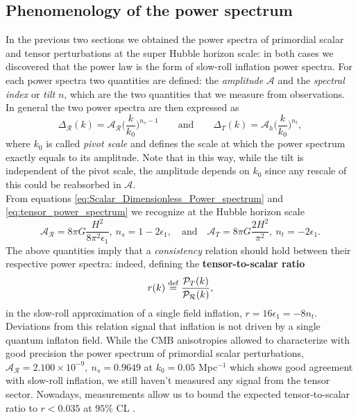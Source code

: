 \subsection{Phenomenology of the power spectrum}
In the previous two sections we obtained the power spectra of primordial scalar and tensor perturbations at the super Hubble horizon scale: in both cases we discovered that the power law is the form of slow-roll inflation power spectra. For each power spectra two quantities are defined: the \emph{amplitude} $\mathcal A$ and the \emph{spectral index} or \emph{tilt} $n$, which are the two quantities that we measure from observations. In general the two power spectra are then expressed as
\begin{equation}
    \Delta_\mathcal{R}(k)=\mathcal{A_R}\bigg(\frac{k}{k_0}\bigg)^{n_s-1}\qquad\text{and}\qquad\Delta_T(k)=\mathcal{A}_h\bigg(\frac{k}{k_0}\bigg)^{n_t},
\end{equation}
where $k_0$ is called \emph{pivot scale} and defines the scale at which the power spectrum exactly equals to its amplitude. Note that in this way, while the tilt is independent of the pivot scale, the amplitude depends on $k_0$ since any rescale of this could be reabsorbed in $\mathcal A$.\\ From equations \eqref{eq:Scalar_Dimensionless_Power_spectrum} and \eqref{eq:tensor_power_spectrum} we recognize at the Hubble horizon scale
\begin{equation}
    \mathcal{A_R}=8\pi G\frac{H^2}{8\pi^2\epsilon_1},\ n_s=1-2\epsilon_1,\quad\text{and}\quad\mathcal{A}_T=8\pi G\frac{2H^2}{\pi^2},\ n_t=-2\epsilon_1.
\end{equation}
The above quantities imply that a \emph{consistency} relation should hold between their respective power spectra: indeed, defining the \textbf{tensor-to-scalar ratio}
\begin{equation}
    r(k)\stackrel{\text{def}}{=}\frac{\mathcal{P}_T(k)}{\mathcal{P_R}(k)},
\end{equation} 
in the slow-roll approximation of a single field inflation, $r=16\epsilon_1=-8n_t$. Deviations from this relation signal that inflation is not driven by a single quantum inflaton field. While the CMB anisotropies allowed to characterize with good precision the power spectrum of primordial scalar perturbations, $\mathcal{A_R}=2.100\times 10^{-9},\ n_s=0.9649$ at $k_0=0.05$ Mpc$^{-1}$ \cite{planck2018results} which shows good agreement with slow-roll inflation, we still haven't measured any signal from the tensor sector. Nowadays, measurements allow us to bound the expected tensor-to-scalar ratio to $r<0.035$ at $95\%$ CL \cite{Ade_2021}.

